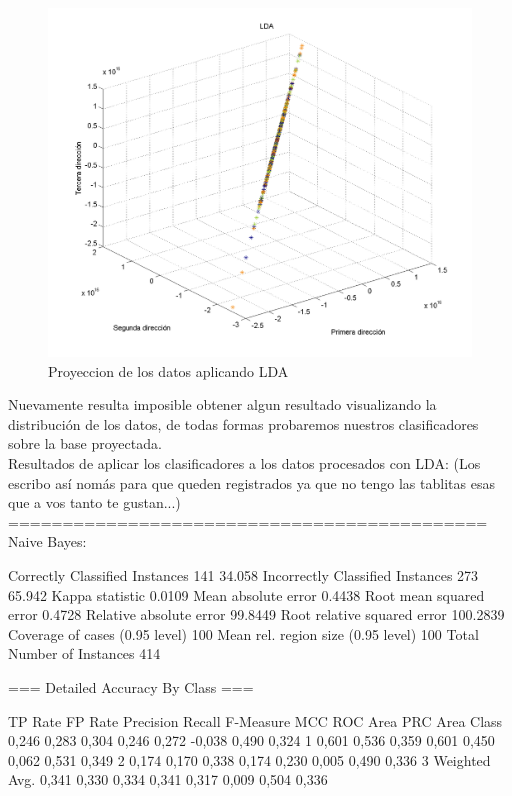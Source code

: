 \documentclass[12pt,a4paper,titlepage]{report}
\begin{document}
\begin{figure}[H]
	\centering 
	\includegraphics[width=.8\textwidth]{pics/lda}
	\caption{Proyeccion de los datos aplicando LDA}
	\label{fig:lda}
\end{figure}

Nuevamente resulta imposible obtener algun resultado visualizando la distribución de los datos, de todas formas probaremos nuestros clasificadores sobre la base proyectada.\\ 

Resultados de aplicar los clasificadores a los datos procesados con LDA: (Los escribo así nomás para que queden registrados ya que no tengo las tablitas esas que a vos tanto te gustan...)\\	

============================================\\
Naive Bayes:
	
Correctly Classified Instances         141               34.058  %
Incorrectly Classified Instances       273               65.942  %
Kappa statistic                          0.0109
Mean absolute error                      0.4438
Root mean squared error                  0.4728
Relative absolute error                 99.8449 %
Root relative squared error            100.2839 %
Coverage of cases (0.95 level)         100      %
Mean rel. region size (0.95 level)     100      %
Total Number of Instances              414     

=== Detailed Accuracy By Class ===

                 TP Rate  FP Rate  Precision  Recall   F-Measure  MCC      ROC Area  PRC Area  Class
                 0,246    0,283    0,304      0,246    0,272      -0,038   0,490     0,324     1
                 0,601    0,536    0,359      0,601    0,450      0,062    0,531     0,349     2
                 0,174    0,170    0,338      0,174    0,230      0,005    0,490     0,336     3
Weighted Avg.    0,341    0,330    0,334      0,341    0,317      0,009    0,504     0,336     
\end{document}
